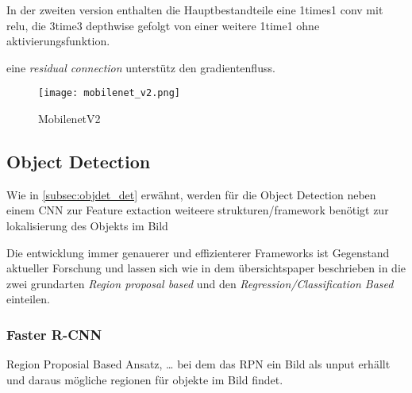 



In der zweiten version \cite{sandlerMobileNetV2InvertedResiduals2019} enthalten die 
Hauptbestandteile eine 1times1 conv mit relu, die 
3time3 depthwise gefolgt von einer weitere 1time1 ohne aktivierungsfunktion.

eine \textit{residual connection} unterstütz den gradientenfluss.

\begin{figure}[H]
    \centering
    \texttt{[image: mobilenet\_v2.png]}
    \caption{MobilenetV2}
    \label{fig:mobilenetv2}
\end{figure}




\subsection{Object Detection}


Wie in \ref{subsec:objdet_det} erwähnt, werden für die 
Object Detection neben einem CNN zur Feature extaction 
weiteere strukturen/framework benötigt zur lokalisierung 
des Objekts im Bild

Die entwicklung immer genauerer und effizienterer 
Frameworks ist Gegenstand aktueller Forschung und lassen 
sich wie in dem übersichtspaper \cite{ouaknineReviewDeepLearning}
beschrieben in die zwei grundarten \textit{Region proposal based} 
und den \textit{Regression/Classification Based} einteilen.



\subsubsection{Faster R-CNN}
Region Proposial Based Ansatz, \dots \cite{renFasterRCNNRealTime2016a}
bei dem das RPN ein Bild als unput erhällt und
daraus mögliche regionen für objekte im Bild findet.

